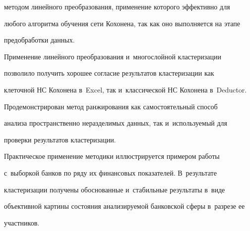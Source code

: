 методом линейного преобразования, применение которого эффективно для 


любого алгоритма обучения сети Кохонена, так как оно выполняется на этапе 


предобработки данных.


  


  Применение линейного преобразования и~многослойной кластеризации 


позволило получить хорошее согласие результатов кластеризации как 


клеточной НС Кохонена в~Excel, так и~классической НС Кохонена в~Deductor.


  


  Продемонстрирован метод ранжирования как самостоятельный способ 


анализа пространственно неразделимых данных, так и~используемый для 


проверки результатов кластеризации. 


  


  Практическое применение методики иллюстрируется примером работы 


с~выборкой банков по ряду их финансовых показателей. В~результате 


кластеризации получены обоснованные и~стабильные результаты в~виде 


объективной картины состояния анализируемой банковской сферы в~разрезе ее 


участников.







  


